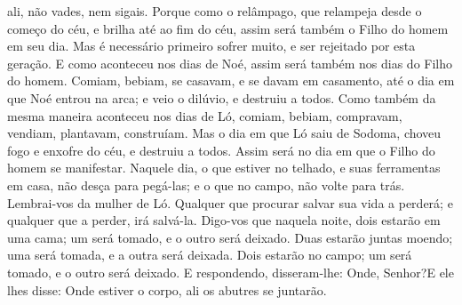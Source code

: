 {{} ali, não vades, nem sigais.
  Porque como o relâmpago, que relampeja desde o começo do céu, e brilha até ao fim do céu, assim será também o Filho do homem em seu dia.
  Mas é necessário primeiro sofrer muito, e ser rejeitado por esta geração.
  E como aconteceu nos dias de Noé, assim será também nos dias do Filho do homem.
  Comiam, bebiam, se casavam, e se davam em casamento, até o dia em que Noé entrou na arca; e veio o dilúvio, e destruiu a todos.
  Como também da mesma maneira aconteceu nos dias de Ló, comiam, bebiam, compravam, vendiam, plantavam,
{} construíam.
  Mas o dia em que Ló saiu de Sodoma, choveu fogo e enxofre do céu, e destruiu a todos.
  Assim será
{} no dia em que o Filho do homem se manifestar.
  Naquele dia, o que estiver no telhado, e suas ferramentas em casa, não desça para pegá-las; e o que
{} no campo, não volte para trás.
  Lembrai-vos da mulher de Ló.
  Qualquer que procurar salvar sua vida a perderá; e qualquer que a perder, irá salvá-la.
  Digo-vos que naquela noite, dois estarão em uma cama; um será tomado, e o outro será deixado.
  Duas estarão juntas moendo; uma será tomada, e a outra será deixada.
  Dois estarão no campo; um será tomado, e o outro será deixado.
  E respondendo, disseram-lhe: Onde, Senhor?E ele lhes disse: Onde estiver o corpo, ali os abutres se juntarão.
\par }


